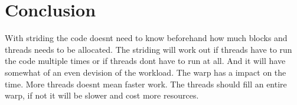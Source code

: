 \section{Conclusion}
\label{sec:conclusion}

With striding the code doesnt need to know beforehand how much blocks and threads needs to be allocated. The striding will work out if threads have to run the code multiple times or if threads dont have to run at all. And it will have somewhat of an even devision of the workload.
The warp has a impact on the time. More threads doesnt mean faster work. The threads should fill an entire warp, if not it will be slower and cost more resources.
